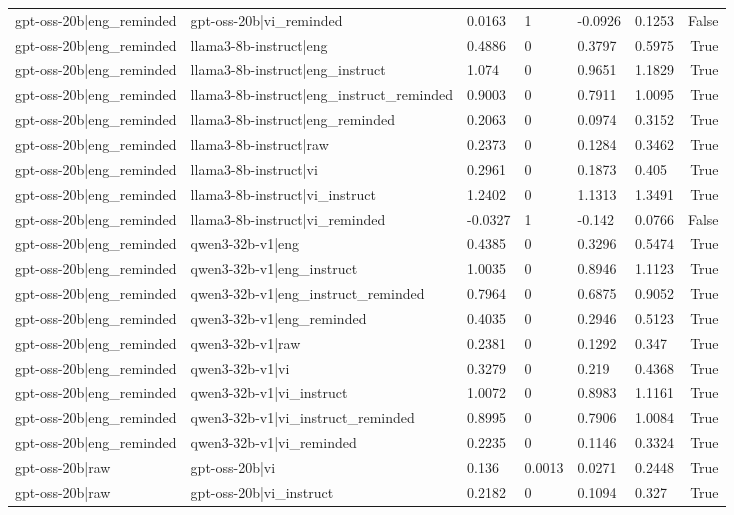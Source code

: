 \begin{table}
\begin{tabular}{llllllr}
gpt-oss-20b|eng_reminded & gpt-oss-20b|vi_reminded & 0.0163 & 1 & -0.0926 & 0.1253 & False \\
gpt-oss-20b|eng_reminded & llama3-8b-instruct|eng & 0.4886 & 0 & 0.3797 & 0.5975 & True \\
gpt-oss-20b|eng_reminded & llama3-8b-instruct|eng_instruct & 1.074 & 0 & 0.9651 & 1.1829 & True \\
gpt-oss-20b|eng_reminded & llama3-8b-instruct|eng_instruct_reminded & 0.9003 & 0 & 0.7911 & 1.0095 & True \\
gpt-oss-20b|eng_reminded & llama3-8b-instruct|eng_reminded & 0.2063 & 0 & 0.0974 & 0.3152 & True \\
gpt-oss-20b|eng_reminded & llama3-8b-instruct|raw & 0.2373 & 0 & 0.1284 & 0.3462 & True \\
gpt-oss-20b|eng_reminded & llama3-8b-instruct|vi & 0.2961 & 0 & 0.1873 & 0.405 & True \\
gpt-oss-20b|eng_reminded & llama3-8b-instruct|vi_instruct & 1.2402 & 0 & 1.1313 & 1.3491 & True \\
gpt-oss-20b|eng_reminded & llama3-8b-instruct|vi_reminded & -0.0327 & 1 & -0.142 & 0.0766 & False \\
gpt-oss-20b|eng_reminded & qwen3-32b-v1|eng & 0.4385 & 0 & 0.3296 & 0.5474 & True \\
gpt-oss-20b|eng_reminded & qwen3-32b-v1|eng_instruct & 1.0035 & 0 & 0.8946 & 1.1123 & True \\
gpt-oss-20b|eng_reminded & qwen3-32b-v1|eng_instruct_reminded & 0.7964 & 0 & 0.6875 & 0.9052 & True \\
gpt-oss-20b|eng_reminded & qwen3-32b-v1|eng_reminded & 0.4035 & 0 & 0.2946 & 0.5123 & True \\
gpt-oss-20b|eng_reminded & qwen3-32b-v1|raw & 0.2381 & 0 & 0.1292 & 0.347 & True \\
gpt-oss-20b|eng_reminded & qwen3-32b-v1|vi & 0.3279 & 0 & 0.219 & 0.4368 & True \\
gpt-oss-20b|eng_reminded & qwen3-32b-v1|vi_instruct & 1.0072 & 0 & 0.8983 & 1.1161 & True \\
gpt-oss-20b|eng_reminded & qwen3-32b-v1|vi_instruct_reminded & 0.8995 & 0 & 0.7906 & 1.0084 & True \\
gpt-oss-20b|eng_reminded & qwen3-32b-v1|vi_reminded & 0.2235 & 0 & 0.1146 & 0.3324 & True \\
gpt-oss-20b|raw & gpt-oss-20b|vi & 0.136 & 0.0013 & 0.0271 & 0.2448 & True \\
gpt-oss-20b|raw & gpt-oss-20b|vi_instruct & 0.2182 & 0 & 0.1094 & 0.327 & True \\

\end{tabular}
\end{table}
